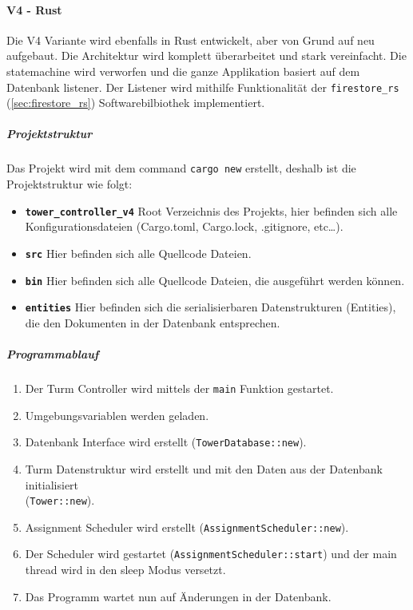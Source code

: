 \paragraph{V4 - Rust}

Die V4 Variante wird ebenfalls in Rust entwickelt, aber von Grund auf neu aufgebaut. Die Architektur wird komplett überarbeitet und stark vereinfacht. Die \Gls{statemachine} wird verworfen und die ganze Applikation basiert auf dem Datenbank \Gls{listener}. Der Listener wird mithilfe Funktionalität der \texttt{firestore\_rs} (\ref{sec:firestore_rs}) Softwarebilbiothek implementiert.

\subparagraph{Projektstruktur}

Das Projekt wird mit dem command \texttt{cargo new} erstellt, deshalb ist die Projektstruktur wie folgt:


\begin{itemize}
  \item \textbf{\texttt{tower\_controller\_v4}} Root Verzeichnis des Projekts, hier befinden sich alle    Konfigurationsdateien (Cargo.toml, Cargo.lock, .gitignore, etc\ldots{}).
  \item \textbf{\texttt{src}} Hier befinden sich alle Quellcode Dateien.
  \item \textbf{\texttt{bin}} Hier befinden sich alle Quellcode Dateien, die ausgeführt werden können.
  \item \textbf{\texttt{entities}} Hier befinden sich die serialisierbaren Datenstrukturen (Entities), die den Dokumenten in der Datenbank entsprechen.
\end{itemize}

\subparagraph{Programmablauf}
\begin{enumerate}
  \item Der Turm Controller wird mittels der \texttt{main} Funktion gestartet.
  \item Umgebungsvariablen werden geladen.
  \item Datenbank Interface wird erstellt (\texttt{TowerDatabase::new}).
  \item Turm Datenstruktur wird erstellt und mit den Daten aus der Datenbank initialisiert\\(\texttt{Tower::new}).
  \item Assignment Scheduler wird erstellt (\texttt{AssignmentScheduler::new}).
  \item Der Scheduler wird gestartet (\texttt{AssignmentScheduler::start}) und der main \Gls{thread} wird in den \Gls{sleep} Modus versetzt.
  \item Das Programm wartet nun auf Änderungen in der Datenbank.
\end{enumerate}

